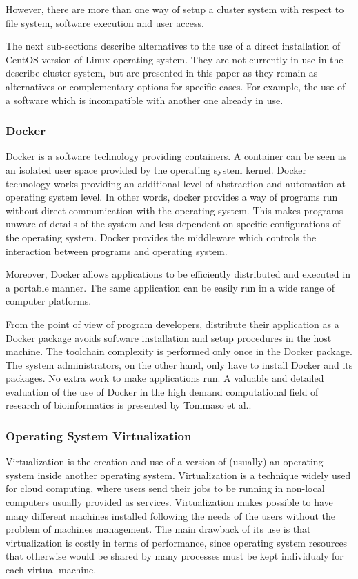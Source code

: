 \documentclass[twoside,a4paper,12pt,english]{inac17}
\begin{document}
However, there are more than one way of setup a cluster system with respect
to file system, software execution and user access.

The next sub-sections describe alternatives to the use of a direct installation of CentOS version of Linux operating system.
They are not currently in use in the describe cluster system, but are presented in this paper as they remain as alternatives
or complementary options for specific cases. For example, the use of a software which is incompatible with another one already
in use.

\subsubsection{Docker}
\label{ssub:dock}

Docker is a software technology providing containers. A container can be seen as an isolated user space provided by the operating system
kernel. Docker technology works providing an additional level of abstraction and automation at operating system level. In other words,
docker provides a way of programs run without direct communication with the operating system. This makes programs unware of details of the
system and less dependent on specific configurations of the operating system. Docker provides the middleware which controls the interaction
between programs and operating system.

Moreover, Docker allows applications to be efficiently distributed and executed in a portable manner. The same application can be easily
run in a wide range of computer platforms\cite{Boettiger}.

From the point of view of program developers, distribute their application as a Docker package avoids software installation and
setup procedures in the host machine. The toolchain complexity is performed only once in the Docker package. The system administrators,
on the other hand, only have to install Docker and its packages. No extra work to make applications run. A valuable and detailed evaluation
of the use of Docker in the high demand computational field of research of bioinformatics is presented by Tommaso et al.\cite{Tommaso}.


\subsubsection{Operating System Virtualization}
\label{ssub:virt}

Virtualization is the creation and use of a version of (usually) an operating system inside another operating system. Virtualization
is a technique widely used for cloud computing, where users send their jobs to be running in non-local computers usually provided
as services. Virtualization makes possible to have many different machines installed following the needs of the users without the
problem of machines management. The main drawback of its use is that virtualization is costly in terms of performance, since operating system
resources that otherwise would be shared by many processes must be kept individualy for each virtual machine.
\end{document}
